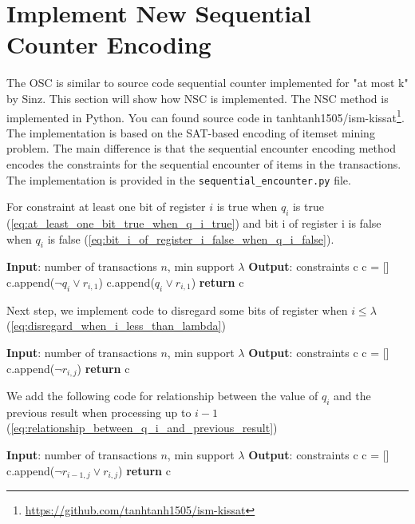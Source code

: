 \section{Implement New Sequential Counter Encoding}

The OSC is similar to source code sequential counter implemented for "at most k" by Sinz\cite{carstensinz}.
This section will show how NSC is implemented.
The NSC method is implemented in Python.
You can found source code in tanhtanh1505/ism-kissat\footnote{\url{https://github.com/tanhtanh1505/ism-kissat}}.
The implementation is based on the SAT-based encoding of itemset mining problem.
The main difference is that the sequential encounter encoding method encodes the constraints for the sequential encounter of items in the transactions.
The implementation is provided in the \texttt{sequential\_encounter.py} file.

For constraint at least one bit of register $i$ is true when $q_i$ is true (\ref{eq:at_least_one_bit_true_when_q_i_true})
and bit i of register i is false when $q_i$ is false (\ref{eq:bit_i_of_register_i_false_when_q_i_false}).
\begin{algorithm}
    \begin{algorithmic}[1]
        \State \textbf{Input}: number of transactions $n$, min support $\lambda$
        \State \textbf{Output}: constraints c
        \State c = []
        \State c.append($\neg q_i \vee r_{i,1}$)
        \State c.append($q_i \vee r_{i,1}$)
        \EndIf
        \EndFor
        \State \textbf{return} c
    \end{algorithmic}
\end{algorithm}

\vspace{15cm}
Next step, we implement code to disregard some bits of register
when $i \le \lambda$ (\ref{eq:disregard_when_i_less_than_lambda})
\begin{algorithm}
    \begin{algorithmic}[1]
        \State \textbf{Input}: number of transactions $n$, min support $\lambda$
        \State \textbf{Output}: constraints c
        \State c = []
        \State c.append($\neg r_{i,j}$)
        \EndFor
        \EndFor
        \State \textbf{return} c
    \end{algorithmic}
\end{algorithm}

We add the following code for relationship between the value of $q_i$ and the previous result when processing up to $i-1$ (\ref{eq:relationship_between_q_i_and_previous_result})
\begin{algorithm}
    \begin{algorithmic}[1]
        \State \textbf{Input}: number of transactions $n$, min support $\lambda$
        \State \textbf{Output}: constraints c
        \State c = []
        \State c.append($\neg r_{i-1,j} \vee r_{i,j}$)
        \EndFor
        \EndFor
        \State \textbf{return} c
    \end{algorithmic}
\end{algorithm}

